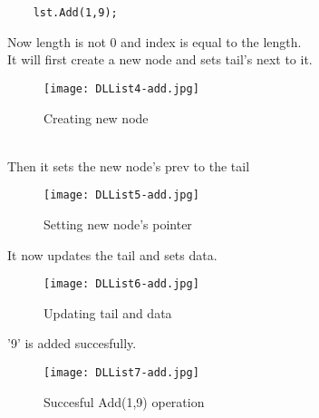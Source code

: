 \documentclass[11pt,fleqn]{book} %
\begin{document}
\begin{example}
	\begin{lstlisting}
	lst.Add(1,9);
	\end{lstlisting}
	Now length is not 0 and index is equal to the length.\\
	It will first create a new node and sets tail's next to it.
	\begin{figure}[H]
		\centering
		\texttt{[image: DLList4-add.jpg]}
		\caption{Creating new node}
	\end{figure} ~\\
	Then it sets the new node's prev to the tail
	\begin{figure}[H]
		\centering
		\texttt{[image: DLList5-add.jpg]}
		\caption{Setting new node's pointer}
	\end{figure}
	It now updates the tail and sets data.
	\begin{figure}[H]
		\centering
		\texttt{[image: DLList6-add.jpg]}
		\caption{Updating tail and data}
	\end{figure}
	'9' is added succesfully.
	{\begin{figure}[H]
			\centering
			\texttt{[image: DLList7-add.jpg]}
			\caption{Succesful Add(1,9) operation}
	\end{figure}}
\end{example}
\end{document}
